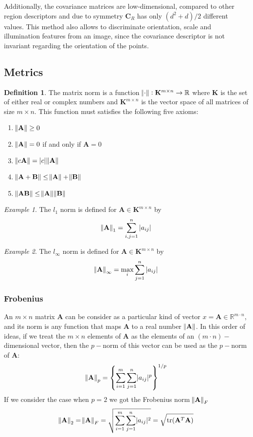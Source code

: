 \documentclass[11pt]{article}
\theoremstyle{definition}
\newtheorem{definition}{Definition}[section]
\theoremstyle{remark}
\theoremstyle{remark}
\theoremstyle{remark}
\newtheorem{example}{Example}
\newcommand{\R}{{\mathbb{R}}}
\begin{document}
Additionally, the covariance matrices are low-dimensional, compared to other
region descriptors and due to symmetry $\mathbf{C}_{R}$ has only
$\left(d^{2}+d\right) / 2$ different values. This method also allows to
discriminate orientation, scale and illumination features from an image, since
the covariance descriptor is not invariant regarding the orientation of the
points.

\subsection{Metrics}
\begin{definition}
  The matrix norm is a function $\norm{\cdot}: \mathbf{K}^{m \times n} \to \R$
  where $\mathbf{K}$ is the set of either real or complex numbers and
  $\mathbf{K}^{m \times n}$ is the vector space of all matrices of size
  $m \times n$. This function must satisfies the following five axioms:
  \begin{enumerate}
    \item $\norm{\mathbf{A}} \geq 0$
    \item $\norm{\mathbf{A}} = 0$ if and only if $\mathbf{A} = 0$
    \item $\norm{c\mathbf{A}} = |c|\norm{\mathbf{A}}$
    \item $\norm{\mathbf{A} + \mathbf{B}} \leq \norm{\mathbf{A}} + \norm{\mathbf{B}}$
    \item $\norm{\mathbf{AB}} \leq \norm{\mathbf{A}}\norm{\mathbf{B}}$
  \end{enumerate}
\end{definition}

\begin{example}
  The $l_{1}$ norm is defined for $\mathbf{A} \in \mathbf{K}^{m \times n}$ by
  \[
    \norm{\mathbf{A}}_{1} = \sum_{i,j = 1}^{n} |a_{ij}|
  \]
\end{example}

\begin{example}
  The $l_{\infty}$ norm is defined for $\mathbf{A} \in \mathbf{K}^{m \times n}$
  by
  \[
    \norm{\mathbf{A}}_{\infty} = \max_{i}{\sum_{j = 1}^{n} |a_{ij}|}
  \]
\end{example}

\subsubsection{Frobenius}
An $m \times n$ matrix $\mathbf{A}$ can be consider as a particular kind of
vector $x = \mathbf{A} \in \R^{m\cdot n}$, and its norm is any function that maps
$\mathbf{A}$ to a real number $\norm{\mathbf{A}}$. In this order of ideas, if we
treat the $m \times n$ elements of $\mathbf{A}$ as the elements of an
$(m\cdot n)-$dimensional vector, then the $p-$norm of this vector can be used as the
$p-$norm of $\mathbf{A}$:
%
\[
  \norm{\mathbf{A}}_{p} = \left\{ \sum_{i = 1}^{m} \sum_{j=1}^{n} \lvert a_{ij} \rvert^{p} \right\}^{1/p}
\]
%
If we consider the case when $p = 2$ we got the Frobenius norm
$\norm{\mathbf{A}}_{F}$
%
\[
  \norm{\mathbf{A}}_{2} = \norm{\mathbf{A}}_{F} = \sqrt{\sum_{i=1}^{m} \sum_{j=1}^{n} \lvert a_{ij} \rvert^{2}} = \sqrt{\mathrm{tr}(\mathbf{A}^{T}\mathbf{A})}
\]
\end{document}
